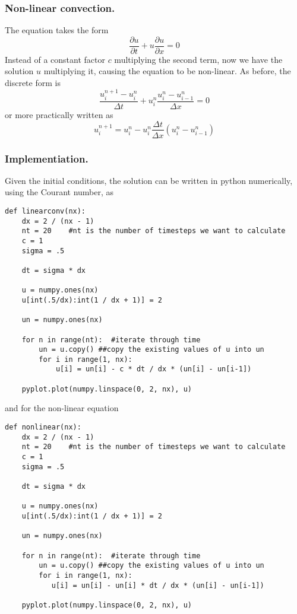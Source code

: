 \documentclass[../../../main.tex]{subfiles}
\begin{document}
\subsubsection{Non-linear convection.}
The equation takes the form
\begin{equation*}
    \frac{\partial u}{\partial t} + u \frac{\partial u}{\partial x} = 0
\end{equation*}
Instead of a constant factor $c$ multiplying the second term, now we have the solution $u$ multiplying it, causing the equation to be non-linear.
As before, the discrete form is
\begin{equation*}
    \frac{u_i^{n+1}-u_i^n}{\Delta t} + u_i^n \frac{u_i^n-u_{i-1}^n}{\Delta x} = 0
\end{equation*}
or more practically written as
\begin{equation*}
    u_i^{n+1} = u_i^n - u_i^n \frac{\Delta t}{\Delta x} (u_i^n - u_{i-1}^n)
\end{equation*}

\subsubsection*{Implementiation.}
Given the initial conditions, the solution can be written in python numerically, using the Courant number, as
\begin{verbatim}
def linearconv(nx):
    dx = 2 / (nx - 1)
    nt = 20    #nt is the number of timesteps we want to calculate
    c = 1
    sigma = .5
    
    dt = sigma * dx

    u = numpy.ones(nx) 
    u[int(.5/dx):int(1 / dx + 1)] = 2

    un = numpy.ones(nx)

    for n in range(nt):  #iterate through time
        un = u.copy() ##copy the existing values of u into un
        for i in range(1, nx):
            u[i] = un[i] - c * dt / dx * (un[i] - un[i-1])
        
    pyplot.plot(numpy.linspace(0, 2, nx), u)
\end{verbatim}
and for the non-linear equation
\begin{verbatim}
def nonlinear(nx):
    dx = 2 / (nx - 1)
    nt = 20    #nt is the number of timesteps we want to calculate
    c = 1
    sigma = .5
    
    dt = sigma * dx

    u = numpy.ones(nx) 
    u[int(.5/dx):int(1 / dx + 1)] = 2

    un = numpy.ones(nx)

    for n in range(nt):  #iterate through time
        un = u.copy() ##copy the existing values of u into un
        for i in range(1, nx):
           u[i] = un[i] - un[i] * dt / dx * (un[i] - un[i-1]) 
        
    pyplot.plot(numpy.linspace(0, 2, nx), u)
\end{verbatim}
\end{document}
